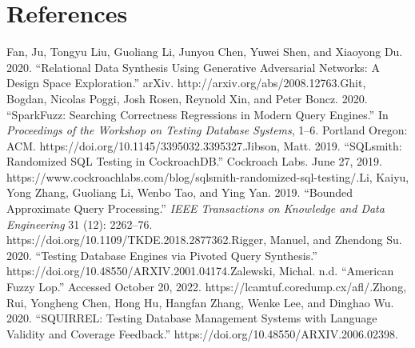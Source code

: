 \hypertarget{references}{%
\section{References}\label{references}}

Fan, Ju, Tongyu Liu, Guoliang Li, Junyou Chen, Yuwei Shen, and Xiaoyong
Du. 2020. ``Relational Data Synthesis Using Generative Adversarial
Networks: A Design Space Exploration.'' arXiv.
http://arxiv.org/abs/2008.12763.Ghit, Bogdan, Nicolas Poggi, Josh Rosen,
Reynold Xin, and Peter Boncz. 2020. ``SparkFuzz: Searching Correctness
Regressions in Modern Query Engines.'' In \emph{Proceedings of the
Workshop on Testing Database Systems}, 1--6. Portland Oregon: ACM.
https://doi.org/10.1145/3395032.3395327.Jibson, Matt. 2019. ``SQLsmith:
Randomized SQL Testing in CockroachDB.'' Cockroach Labs. June 27, 2019.
https://www.cockroachlabs.com/blog/sqlsmith-randomized-sql-testing/.Li,
Kaiyu, Yong Zhang, Guoliang Li, Wenbo Tao, and Ying Yan. 2019. ``Bounded
Approximate Query Processing.'' \emph{IEEE Transactions on Knowledge and
Data Engineering} 31 (12): 2262--76.
https://doi.org/10.1109/TKDE.2018.2877362.Rigger, Manuel, and Zhendong
Su. 2020. ``Testing Database Engines via Pivoted Query Synthesis.''
https://doi.org/10.48550/ARXIV.2001.04174.Zalewski, Michal. n.d.
``American Fuzzy Lop.'' Accessed October 20, 2022.
https://lcamtuf.coredump.cx/afl/.Zhong, Rui, Yongheng Chen, Hong Hu,
Hangfan Zhang, Wenke Lee, and Dinghao Wu. 2020. ``SQUIRREL: Testing
Database Management Systems with Language Validity and Coverage
Feedback.'' https://doi.org/10.48550/ARXIV.2006.02398.
